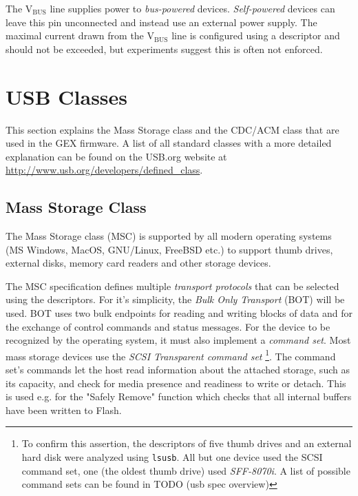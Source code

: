 The V$_\mathrm{BUS}$ line supplies power to \textit{bus-powered} devices. \textit{Self-powered} devices can leave this pin unconnected and instead use an external power supply. The maximal current drawn from the V$_\mathrm{BUS}$ line is configured using a descriptor and should not be exceeded, but experiments suggest this is often not enforced.

\section{USB Classes}

This section explains the Mass Storage class and the CDC/ACM class that are used in the GEX firmware. A list of all standard classes with a more detailed explanation can be found on the USB.org website at \url{http://www.usb.org/developers/defined\_class}.

\subsection{Mass Storage Class}

The Mass Storage class (MSC) is supported by all modern operating systems (MS Windows, MacOS, GNU/Linux, FreeBSD etc.) to support thumb drives, external disks, memory card readers and other storage devices.


The MSC specification defines multiple \textit{transport protocols} that can be selected using the descriptors. For it's simplicity, the \textit{Bulk Only Transport} (BOT) will be used. BOT uses two bulk endpoints for reading and writing blocks of data and for the exchange of control commands and status messages. For the device to be recognized by the operating system, it must also implement a \textit{command set}. Most mass storage devices use the \textit{SCSI Transparent command set} 
\footnote{To confirm this assertion, the descriptors of five thumb drives and an external hard disk were analyzed using \verb|lsusb|. All but one device used the SCSI command set, one (the oldest thumb drive) used \textit{SFF-8070i}. A list of possible command sets can be found in TODO (usb spec overview)}.
The command set's commands let the host read information about the attached storage, such as its capacity, and check for media presence and readiness to write or detach. This is used e.g. for the "Safely Remove" function which checks that all internal buffers have been written to Flash.

